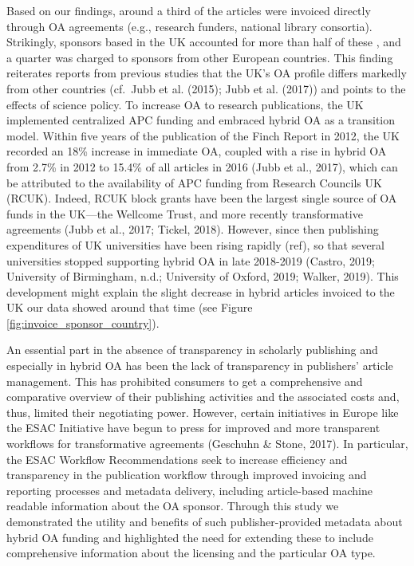 \documentclass[a4paper,man,floatsintext,longtable,noextraspace,12pt]{apa6}
\begin{document}
Based on our findings, around a third of the articles were invoiced
directly through OA agreements (e.g., research funders, national library
consortia). Strikingly, sponsors based in the UK accounted for more than
half of these , and a quarter was charged to sponsors from other
European countries. This finding reiterates reports from previous
studies that the UK's OA profile differs markedly from other countries
(cf.~Jubb et al. (2015); Jubb et al. (2017)) and points to the effects
of science policy. To increase OA to research publications, the UK
implemented centralized APC funding and embraced hybrid OA as a
transition model. Within five years of the publication of the Finch
Report in 2012, the UK recorded an 18\% increase in immediate OA,
coupled with a rise in hybrid OA from 2.7\% in 2012 to 15.4\% of all
articles in 2016 (Jubb et al., 2017), which can be attributed to the
availability of APC funding from Research Councils UK (RCUK). Indeed,
RCUK block grants have been the largest single source of OA funds in the
UK---the Wellcome Trust, and more recently transformative agreements
(Jubb et al., 2017; Tickel, 2018). However, since then publishing
expenditures of UK universities have been rising rapidly (ref), so that
several universities stopped supporting hybrid OA in late 2018-2019
(Castro, 2019; University of Birmingham, n.d.; University of Oxford,
2019; Walker, 2019). This development might explain the slight decrease
in hybrid articles invoiced to the UK our data showed around that time
(see Figure \ref{fig:invoice_sponsor_country}).

An essential part in the absence of transparency in scholarly publishing
and especially in hybrid OA has been the lack of transparency in
publishers' article management. This has prohibited consumers to get a
comprehensive and comparative overview of their publishing activities
and the associated costs and, thus, limited their negotiating power.
However, certain initiatives in Europe like the ESAC Initiative have
begun to press for improved and more transparent workflows for
transformative agreements (Geschuhn \& Stone, 2017). In particular, the
ESAC Workflow Recommendations seek to increase efficiency and
transparency in the publication workflow through improved invoicing and
reporting processes and metadata delivery, including article-based
machine readable information about the OA sponsor. Through this study we
demonstrated the utility and benefits of such publisher-provided
metadata about hybrid OA funding and highlighted the need for extending
these to include comprehensive information about the licensing and the
particular OA type.
\end{document}

